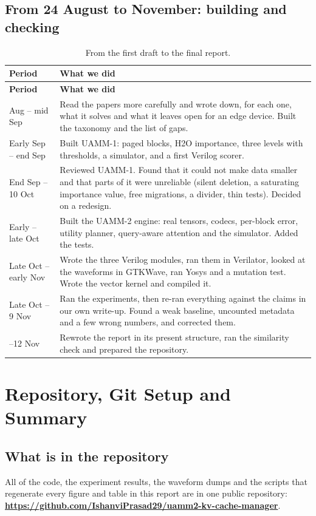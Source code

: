 \documentclass[12pt,a4paper]{report}
\begin{document}
\section{From 24 August to November: building and checking}
{\fontsize{9}{10.5}\selectfont\setlength{\tabcolsep}{3pt}
\begin{longtable}{>{\raggedright\arraybackslash}p{1.33in}>{\raggedright\arraybackslash}p{4.73in}}
\caption{From the first draft to the final report.}\\
\toprule
\textbf{Period} & \textbf{What we did} \\\midrule\endfirsthead
\toprule \textbf{Period} & \textbf{What we did} \\\midrule\endhead
\bottomrule\endfoot
25 Aug – mid Sep & Read the papers more carefully and wrote down, for each one, what it solves and what it leaves open for an edge device. Built the taxonomy and the list of gaps. \\
Early Sep – end Sep & Built UAMM-1: paged blocks, H2O importance, three levels with thresholds, a simulator, and a first Verilog scorer. \\
End Sep – 10 Oct & Reviewed UAMM-1. Found that it could not make data smaller and that parts of it were unreliable (silent deletion, a saturating importance value, free migrations, a divider, thin tests). Decided on a redesign. \\
Early – late Oct & Built the UAMM-2 engine: real tensors, codecs, per-block error, utility planner, query-aware attention and the simulator. Added the tests. \\
Late Oct – early Nov & Wrote the three Verilog modules, ran them in Verilator, looked at the waveforms in GTKWave, ran Yosys and a mutation test. Wrote the vector kernel and compiled it. \\
Late Oct – 9 Nov & Ran the experiments, then re-ran everything against the claims in our own write-up. Found a weak baseline, uncounted metadata and a few wrong numbers, and corrected them. \\
9–12 Nov & Rewrote the report in its present structure, ran the similarity check and prepared the repository. \\
\bottomrule
\end{longtable}}
\chapter{Repository, Git Setup and Summary}
\section{What is in the repository}
All of the code, the experiment results, the waveform dumps and the scripts that regenerate every figure and table in this report are in one public repository: \textbf{\url{https://github.com/IshanviPrasad29/uamm2-kv-cache-manager}}.
\end{document}
